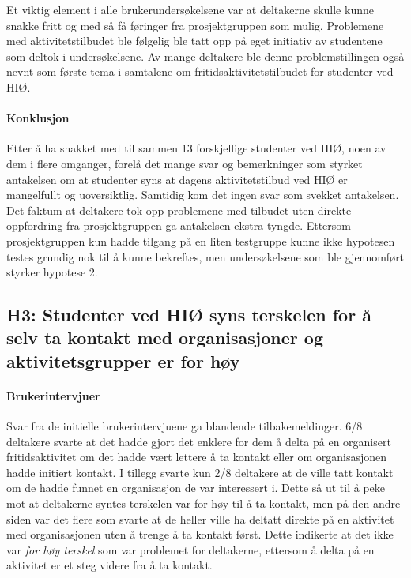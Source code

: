 Et viktig element i alle brukerundersøkelsene var at deltakerne skulle kunne snakke fritt og med så få føringer fra prosjektgruppen som mulig. Problemene med aktivitetstilbudet ble følgelig ble tatt opp på eget initiativ av studentene som deltok i undersøkelsene. Av mange deltakere ble denne problemstillingen også nevnt som første tema i samtalene om fritidsaktivitetstilbudet for studenter ved HIØ.

\paragraph{Konklusjon}
Etter å ha snakket med til sammen 13 forskjellige studenter ved HIØ, noen av dem i flere omganger, forelå det mange svar og bemerkninger som styrket antakelsen om at studenter syns at dagens aktivitetstilbud ved HIØ er mangelfullt og uoversiktlig. Samtidig kom det ingen svar som svekket antakelsen. Det faktum at deltakere tok opp problemene med tilbudet uten direkte oppfordring fra prosjektgruppen ga antakelsen ekstra tyngde. Ettersom prosjektgruppen kun hadde tilgang på en liten testgruppe kunne ikke hypotesen testes grundig nok til å kunne bekreftes, men undersøkelsene som ble gjennomført styrker hypotese 2.

\subsection{H3: Studenter ved HIØ syns terskelen for å selv ta kontakt med organisasjoner og aktivitetsgrupper er for høy}

\paragraph{Brukerintervjuer}
Svar fra de initielle brukerintervjuene ga blandende tilbakemeldinger. 6/8 deltakere svarte at det hadde gjort det enklere for dem å delta på en organisert fritidsaktivitet om det hadde vært lettere å ta kontakt eller om organisasjonen hadde initiert kontakt. I tillegg svarte kun 2/8 deltakere at de ville tatt kontakt om de hadde funnet en organisasjon de var interessert i. Dette så ut til å peke mot at deltakerne syntes terskelen var for høy til å ta kontakt, men på den andre siden var det flere som svarte at de heller ville ha deltatt direkte på en aktivitet med organisasjonen uten å trenge å ta kontakt først. Dette indikerte at det ikke var {\em for høy terskel} som var problemet for deltakerne, ettersom å delta på en aktivitet er et steg videre fra å ta kontakt.

